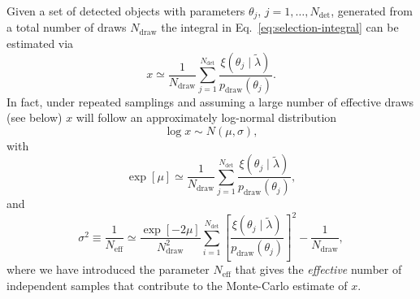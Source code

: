 \documentclass[modern]{aastex62}
\newcommand{\Ndraw}{N_\mathrm{draw}}
\newcommand{\Ndet}{N_\mathrm{det}}
\newcommand{\Neff}{N_\mathrm{eff}}
\newcommand{\pdraw}{p_\mathrm{draw}}
\begin{document}
Given a set of detected objects with parameters $\theta_j$, $j = 1, \ldots,
\Ndet$, generated from a total number of draws $\Ndraw$ the integral in Eq.\
\eqref{eq:selection-integral} can be estimated via
%
\begin{equation}
  x \simeq \frac{1}{\Ndraw} \sum_{j=1}^{\Ndet} \frac{\xi\left( \theta_j \mid \tilde{\lambda} \right)}{\pdraw\left( \theta_j \right)}.
\end{equation}
%
In fact, under repeated samplings and assuming a large number of effective draws
(see below) $x$ will follow an approximately log-normal distribution
%
\begin{equation}
    \log x \sim N\left( \mu, \sigma \right),
\end{equation}
%
with
%
\begin{equation}
  \exp\left[\mu\right] \simeq \frac{1}{\Ndraw} \sum_{j=1}^{\Ndet} \frac{\xi\left( \theta_j \mid \tilde{\lambda} \right)}{\pdraw\left( \theta_j \right)} ,
\end{equation}
%
and
%
\begin{equation}
    \sigma^2 \equiv \frac{1}{\Neff} \simeq \frac{\exp[-2\mu]}{\Ndraw^2} \sum_{i=1}^{\Ndet} \left[ \frac{\xi\left( \theta_j \mid \tilde{\lambda} \right)}{\pdraw\left( \theta_j \right)} \right]^2 - \frac{1}{\Ndraw},
\end{equation}
%
where we have introduced the parameter $\Neff$ that gives the \emph{effective}
number of independent samples that contribute to the Monte-Carlo estimate of
$x$.
\end{document}

